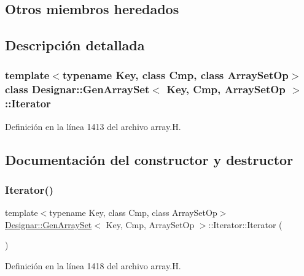 \subsection*{Otros miembros heredados}


\subsection{Descripción detallada}
\subsubsection*{template$<$typename Key, class Cmp, class Array\+Set\+Op$>$\newline
class Designar\+::\+Gen\+Array\+Set$<$ Key, Cmp, Array\+Set\+Op $>$\+::\+Iterator}



Definición en la línea 1413 del archivo array.\+H.



\subsection{Documentación del constructor y destructor}
\mbox{\label{class_designar_1_1_gen_array_set_1_1_iterator_a9f4aba730b697c071ffc51ef70db48ce}} 
\subsubsection{\texorpdfstring{Iterator()}{Iterator()}\hspace{0.1cm}{\footnotesize\ttfamily [1/5]}}
{\footnotesize\ttfamily template$<$typename Key, class Cmp, class Array\+Set\+Op$>$ \\
\hyperlink{class_designar_1_1_gen_array_set}{Designar\+::\+Gen\+Array\+Set}$<$ Key, Cmp, Array\+Set\+Op $>$\+::Iterator\+::\+Iterator (\begin{DoxyParamCaption}{ }\end{DoxyParamCaption})\hspace{0.3cm}{\ttfamily [inline]}}



Definición en la línea 1418 del archivo array.\+H.

